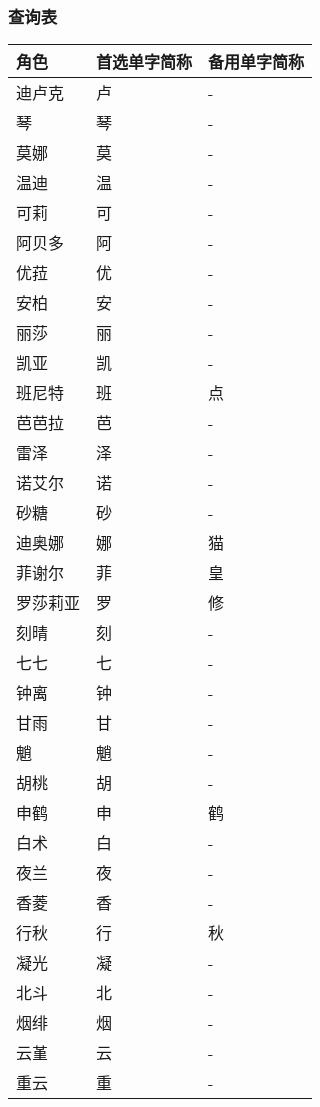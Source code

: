 \subsubsection{查询表}

\begin{longtabu}{|X[2c]|X[c]|X[c]|}
	\hline
	{角色} & {首选单字简称} & {备用单字简称} \\
	\hline
	\endhead
	\hline
	\endfoot
	{迪卢克} & {卢} & {-} \\
	{琴} & {琴} & {-} \\
	{莫娜} & {莫} & {-} \\
	{温迪} & {温} & {-} \\
	{可莉} & {可} & {-} \\
	{阿贝多} & {阿} & {-} \\
	{优菈} & {优} & {-} \\
	\hline
	{安柏} & {安} & {-} \\
	{丽莎} & {丽} & {-} \\
	{凯亚} & {凯} & {-} \\
	{班尼特} & {班} & {点} \\
	{芭芭拉} & {芭} & {-} \\
	{雷泽} & {泽} & {-} \\
	{诺艾尔} & {诺} & {-} \\
	{砂糖} & {砂} & {-} \\
	{迪奥娜} & {娜} & {猫} \\
	{菲谢尔} & {菲} & {皇} \\
	{罗莎莉亚} & {罗} & {修} \\
	\hline
	{刻晴} & {刻} & {-} \\
	{七七} & {七} & {-} \\
	{钟离} & {钟} & {-} \\
	{甘雨} & {甘} & {-} \\
	{魈} & {魈} & {-} \\
	{胡桃} & {胡} & {-} \\
	{申鹤} & {申} & {鹤} \\
	{白术} & {白} & {-} \\
	{夜兰} & {夜} & {-} \\
	{香菱} & {香} & {-} \\
	{行秋} & {行} & {秋} \\
	{凝光} & {凝} & {-} \\
	{北斗} & {北} & {-} \\
	{烟绯} & {烟} & {-} \\
	{云堇} & {云} & {-} \\
	{重云} & {重} & {-} \\

\end{longtabu}
